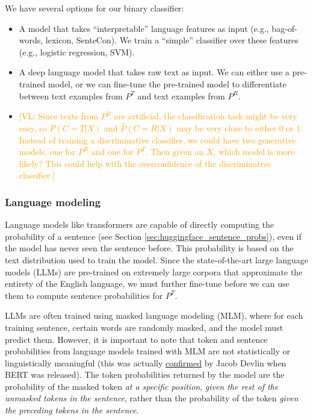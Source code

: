 \documentclass{article}
\newcommand{\vl}[1]{\textcolor{orange}{[VL: #1]}}
\begin{document}
We have several options for our binary classifier:
\begin{itemize}
    \item A model that takes ``interpretable'' language features as input (e.g., bag-of-words, lexicon, SenteCon). We train a ``simple'' classifier over these features (e.g., logistic regression, SVM).
    \item A deep language model that takes raw text as input. We can either use a pre-trained model, or we can fine-tune the pre-trained model to differentiate between text examples from $P^T$ and text examples from $P^R$.
    \item \vl{Since texts from $P^R$ are artificial, the classification task might be very easy, so $\hat{P}(C=T|X)$ and $\hat{P}(C=R|X)$ may be very close to either 0 or 1. Instead of training a discriminative classifier, we could have two generative models, one for $P^R$ and one for $P^T$. Then given an $X$, which model is more likely? This could help with the overconfidence of the discriminative classifier.}
\end{itemize}

\subsubsection{Language modeling}
\label{sec:language_modeling}

Language models like transformers are capable of directly computing the probability of a sentence (see Section \ref{sec:huggingface_sentence_probs}), even if the model has never seen the sentence before. This probability is based on the text distribution used to train the model. Since the state-of-the-art large language models (LLMs) are pre-trained on extremely large corpora that approximate the entirety of the English language, we must further fine-tune before we can use them to compute sentence probabilities for $P^T$.

LLMs are often trained using masked language modeling (MLM), where for each training sentence, certain words are randomly masked, and the model must predict them. However, it is important to note that token and sentence probabilities from language models trained with MLM are not statistically or linguistically meaningful (this was actually \href{https://github.com/google-research/bert/issues/35}{confirmed} by Jacob Devlin when BERT was released). The token probabilities returned by the model are the probability of the masked token \textit{at a specific position}, \textit{given the rest of the unmasked tokens in the sentence}, rather than the probability of the token \textit{given the preceding tokens in the sentence}. 
\end{document}
